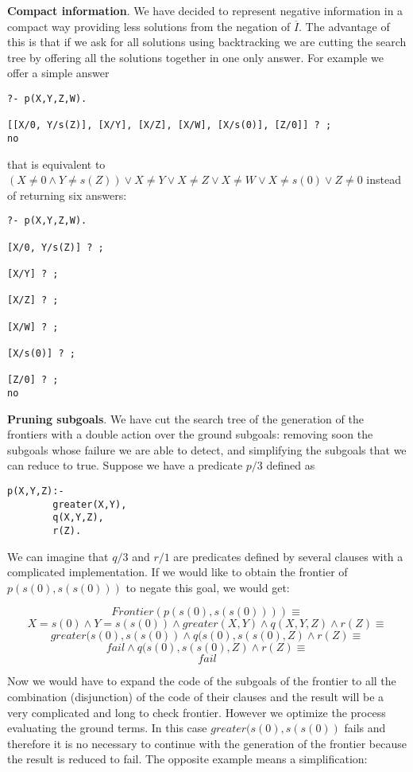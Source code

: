 \documentclass{llncs}
\begin{document}
\noindent
{\bf Compact information}. We have decided to represent negative
information in a compact way providing less solutions from the
negation of $\overline{I}$. The advantage of this is that if we ask
for all solutions using backtracking we are cutting the search tree by
offering all the solutions together in one only answer. For example we
offer a simple answer
\begin{verbatim}
?- p(X,Y,Z,W).

[[X/0, Y/s(Z)], [X/Y], [X/Z], [X/W], [X/s(0)], [Z/0]] ? ;
no
\end{verbatim}

\noindent
that is equivalent to $ (X \neq0 \wedge Y\neq s(Z)) \vee X \neq Y
\vee X \neq Z \vee X \neq W \vee X \neq s(0) \vee Z \neq 0$
instead of returning six answers:
\begin{verbatim}
?- p(X,Y,Z,W).

[X/0, Y/s(Z)] ? ;

[X/Y] ? ;

[X/Z] ? ;

[X/W] ? ;

[X/s(0)] ? ;

[Z/0] ? ;
no
\end{verbatim}


\noindent
{\bf Pruning subgoals}. We have cut the search tree of the generation
of the frontiers with a double action over the ground subgoals:
removing soon the subgoals whose failure we are able to detect, and
simplifying the subgoals that we can reduce to true. Suppose we have a
predicate $p/3$ defined as
\begin{verbatim}
p(X,Y,Z):-
        greater(X,Y),
        q(X,Y,Z),
        r(Z).
\end{verbatim}
We can imagine that $q/3$ and $r/1$ are predicates defined by several
clauses with a complicated implementation. If we would like to obtain
the frontier of $p(s(0),s(s(0)))$ to negate this goal, we would get:

$$Frontier(p(s(0),s(s(0)))) \equiv $$
$${ X=s(0) \wedge Y=s(s(0)) \wedge
  greater(X,Y) \wedge q(X,Y,Z) \wedge r(Z) } \equiv $$
$${ greater(s(0),s(s(0)) \wedge q(s(0),s(s(0),Z) \wedge r(Z) } \equiv $$
$${ fail  \wedge q(s(0),s(s(0),Z) \wedge r(Z) } \equiv $$
$$fail $$

Now we would have to expand the code of the subgoals of the frontier
to all the combination (disjunction) of the code of their clauses and
the result will be a very complicated and long to check frontier.
However we optimize the process evaluating the ground terms. In this
case $greater(s(0),s(s(0))$ fails and therefore it is no necessary to
continue with the generation of the frontier because the result is
reduced to fail. The opposite example means a simplification:
\end{document}
